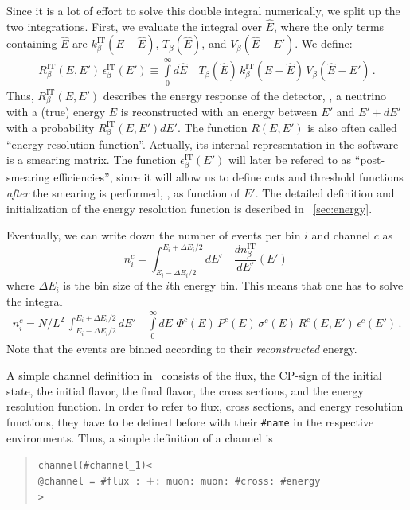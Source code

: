 Since it is a lot of effort to solve this double integral numerically,
we split up the two integrations. First, we evaluate the integral over
$\hat{E}$, where the only terms containing $\hat{E}$ are
$k_\beta^{\text{IT}}(E-\hat{E})$,  $ T_\beta(\hat{E})$, and 
$ V_\beta(\hat{E}-E')$. We define:
\begin{eqnarray}
\label{eq:e_res} 
R_\beta^{\text{IT}}(E,E')\,\epsilon_\beta^{\text{IT}}(E')
 \equiv
\int\limits_0^\infty d\hat{E} \quad T_\beta(\hat{E})\,k_\beta^{\text{IT}}(E-\hat{E})
\,V_\beta(\hat{E}-E')\,. 
\end{eqnarray}
Thus, $R_\beta^{\text{IT}}(E,E')$ describes the energy response of 
the detector, \ie , a neutrino with a (true) energy $E$ is reconstructed
with an energy between $E'$ and $E'+dE'$ with a probability
$R_\beta^{\text{IT}}(E,E') dE'$. The function $R(E,E')$ is also often called ``energy resolution function''. Actually, its internal representation
in the software is a smearing matrix. The function $\epsilon_\beta^{\text{IT}}(E')$ will later be refered to as ``post-smearing efficiencies'', since it will allow us to define cuts and threshold functions {\em after} the smearing is performed, \ie, as function of $E'$. The detailed definition and initialization of the energy resolution function is described in \Sec~\ref{sec:energy}.

Eventually, we can write down the number of events per bin $i$  and channel $c$ as
\begin{equation}
\label{eq:channel}
n_i^c=\int_{E_i-\Delta E_i/2}^{E_i+\Delta E_i/2} dE' \quad
\frac{dn_{\beta}^{\text{IT}}}{dE'} (E') \,
\end{equation}
where $\Delta E_i$ is the bin size of the $i$th energy bin.
This means that one has to solve the integral
\begin{eqnarray}
\label{eq:events_bin}
n_i^c=N/L^2\,\int_{E_i-\Delta E_i/2}^{E_i+\Delta E_i/2} dE' 
\quad \int\limits_0^\infty dE \,\, \Phi^c(E)\,
P^c(E)\,
\sigma^c(E)\,
R^c(E,E')\,
\epsilon^c(E')\,.
\end{eqnarray} 
Note that the events are binned according to their \emph{reconstructed} energy.

A simple channel definition in \GLOBES\ consists of the flux,
the CP-sign of the initial state, the initial flavor, the final flavor,
the cross sections, and the energy resolution function. In order to refer to
flux, cross sections, and energy resolution functions, they have to be 
defined before with their {\tt \#name} in the respective environments. 
Thus, a simple definition of a channel is
\begin{quote}
{\tt channel(\#channel\_1)<\\
\tb @channel = \#flux : $+$: muon: muon: \#cross: \#energy\\
>}
\end{quote}

